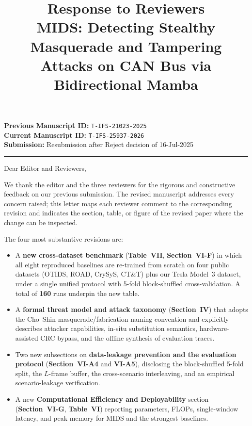 \documentclass[11pt,a4paper]{article}
\title{Response to Reviewers \\
       \large MIDS: Detecting Stealthy Masquerade and Tampering
       Attacks on CAN Bus via Bidirectional Mamba}
\author{}
\date{}
\newcommand{\xref}[1]{\textbf{#1}}
\begin{document}
\maketitle
\vspace{-3em}

\noindent\textbf{Previous Manuscript ID:} \texttt{T-IFS-21023-2025} \\
\noindent\textbf{Current Manuscript ID:} \texttt{T-IFS-25937-2026} \\
\noindent\textbf{Submission:} Resubmission after Reject decision of 16-Jul-2025 \\

\hrule
\medskip

\noindent Dear Editor and Reviewers,

We thank the editor and the three reviewers for the rigorous and
constructive feedback on our previous submission. The revised
manuscript addresses every concern raised; this letter maps each
reviewer comment to the corresponding revision and indicates the
section, table, or figure of the revised paper where the change
can be inspected.

\medskip
\noindent The four most substantive revisions are:
\begin{itemize}[leftmargin=*]
\item A \textbf{new cross-dataset benchmark} (\xref{Table~VII},
\xref{Section~VI-F}) in which all eight reproduced baselines are
re-trained from scratch on four public datasets (OTIDS, ROAD,
CrySyS, CT\&T) plus our Tesla Model~3 dataset, under a single
unified protocol with 5-fold block-shuffled cross-validation.
A total of \textbf{160} runs underpin the new table.
\item A \textbf{formal threat model and attack taxonomy}
(\xref{Section~IV}) that adopts the Cho--Shin masquerade/fabrication
naming convention and explicitly describes attacker capabilities,
in-situ substitution semantics, hardware-assisted CRC bypass, and
the offline synthesis of evaluation traces.
\item Two new subsections on \textbf{data-leakage prevention and
the evaluation protocol} (\xref{Section~VI-A4} and \xref{VI-A5}),
disclosing the block-shuffled 5-fold split, the $L$-frame buffer,
the cross-scenario interleaving, and an empirical scenario-leakage
verification.
\item A new \textbf{Computational Efficiency and Deployability}
section (\xref{Section~VI-G}, \xref{Table~VI}) reporting parameters,
FLOPs, single-window latency, and peak memory for MIDS and the
strongest baselines.
\end{itemize}
\end{document}

